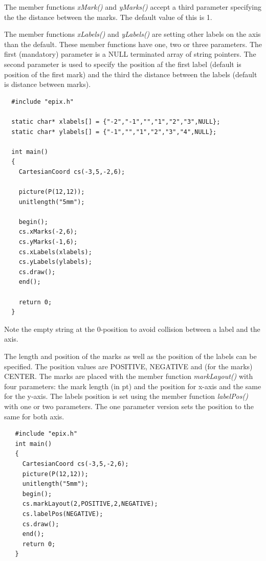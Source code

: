 \documentclass[12pt,a4paper]{article}
\begin{document}
  The member functions \textit{xMark()} and \textit{yMarks()} accept a
  third parameter spe\-ci\-fying the the distance between the
  marks. The default value of this is 1.

  The member functions \textit{xLabels()} and \textit{yLabels()} are
  setting other labels on the axis than the default. These member
  functions have one, two or three parameters. The first (mandatory)
  parameter is a NULL ter\-mi\-na\-ted array of string pointers. The
  second parameter is used to specify the position af the first label
  (default is position of the first mark) and the third the distance
  between the labels (default is distance between marks).

  \begin{minipage}[c]{7.5cm}
    \begin{lstlisting}
  #include "epix.h"

  static char* xlabels[] = {"-2","-1","","1","2","3",NULL};
  static char* ylabels[] = {"-1","","1","2","3","4",NULL};

  int main()
  {
    CartesianCoord cs(-3,5,-2,6);

    picture(P(12,12));
    unitlength("5mm");

    begin();
    cs.xMarks(-2,6);
    cs.yMarks(-1,6);
    cs.xLabels(xlabels);
    cs.yLabels(ylabels);
    cs.draw();
    end();

    return 0;
  }
    \end{lstlisting}
  \end{minipage}
  \begin{minipage}{5.5cm}
    \vspace{5pc}
      
  \end{minipage}

  Note the empty string at the 0-position to avoid collision between a label
  and the axis.

  The length and position of the marks as well as the position of the
  labels can be specified. The position values are POSITIVE, NEGATIVE
  and (for the marks) CENTER. The marks are placed with the member
  function \textit{markLayout()} with four parameters: the mark length
  (in pt) and the position for x-axis and the same for the y-axis. The
  labels position is set using the member function \textit{labelPos()}
  with one or two parameters. The one parameter version sets the
  position to the same for both axis.

  \begin{minipage}{7.5cm}
    \begin{lstlisting}
   #include "epix.h"
   int main()
   {
     CartesianCoord cs(-3,5,-2,6);
     picture(P(12,12));
     unitlength("5mm");
     begin();
     cs.markLayout(2,POSITIVE,2,NEGATIVE);
     cs.labelPos(NEGATIVE);
     cs.draw();
     end();
     return 0;
   }
    \end{lstlisting}
  \end{minipage}
  \begin{minipage}{5.5cm}
    
  \end{minipage}
\end{document}
